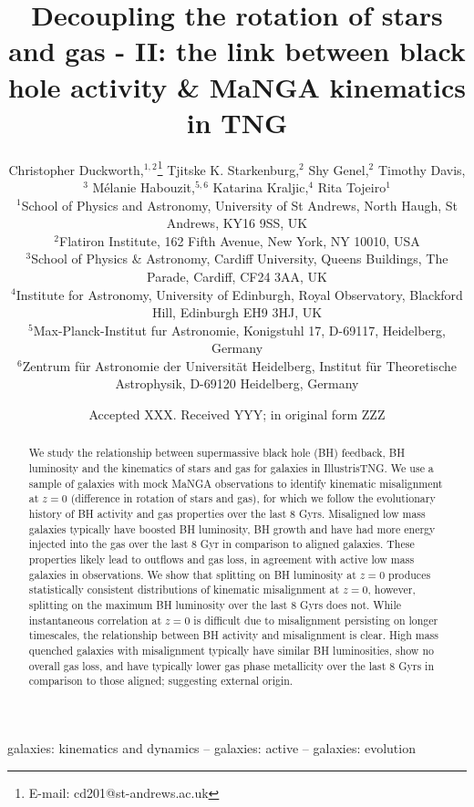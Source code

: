 \documentclass[fleqn,usenatbib]{mnras}
\title[Decoupling the rotation of stars and gas - II]{Decoupling the rotation of stars and gas - II: the link between black hole activity \& MaNGA kinematics in TNG}
\author[C. Duckworth et al.]
{Christopher Duckworth,$^{1,2}$\thanks{E-mail: cd201@st-andrews.ac.uk}
Tjitske K. Starkenburg,$^{2}$ 
Shy Genel,$^{2}$ 
Timothy Davis,$^{3}$ \newauthor
M\'elanie Habouzit,$^{5,6}$
Katarina Kraljic,$^{4}$
Rita Tojeiro$^{1}$ 
\\
$^{1}$School of Physics and Astronomy, University of St Andrews, North Haugh, St Andrews, KY16 9SS, UK\\
$^{2}$Flatiron Institute, 162 Fifth Avenue, New York, NY 10010, USA\\
$^{3}$School of Physics \& Astronomy, Cardiff University, Queens Buildings, The Parade, Cardiff, CF24 3AA, UK\\
$^{4}$Institute for Astronomy, University of Edinburgh, Royal Observatory, Blackford Hill, Edinburgh EH9 3HJ, UK\\
$^{5}$Max-Planck-Institut fur Astronomie, Konigstuhl 17, D-69117, Heidelberg, Germany\\
$^{6}$Zentrum f\"ur Astronomie der Universit\"at Heidelberg, Institut f\"ur Theoretische Astrophysik, D-69120 Heidelberg, Germany\\
}
\date{Accepted XXX. Received YYY; in original form ZZZ}
\begin{document}
\label{firstpage}
\pagerange{\pageref{firstpage}--\pageref{lastpage}}
\maketitle

\begin{abstract}
We study the relationship between supermassive black hole (BH) feedback, BH luminosity and the kinematics of stars and gas for galaxies in IllustrisTNG. We use a sample of galaxies with mock MaNGA observations to identify kinematic misalignment at $z=0$ (difference in rotation of stars and gas), for which we follow the evolutionary history of BH activity and gas properties over the last 8 Gyrs. Misaligned low mass galaxies typically have boosted BH luminosity, BH growth and have had more energy injected into the gas over the last 8 Gyr in comparison to aligned galaxies. These properties likely lead to outflows and gas loss, in agreement with active low mass galaxies in observations. We show that splitting on BH luminosity at $z=0$ produces statistically consistent distributions of kinematic misalignment at $z=0$, however, splitting on the maximum BH luminosity over the last 8 Gyrs does not. While instantaneous correlation at $z=0$ is difficult due to misalignment persisting on longer timescales, the relationship between BH activity and misalignment is clear. High mass quenched galaxies with misalignment typically have similar BH luminosities, show no overall gas loss, and have typically lower gas phase metallicity over the last 8 Gyrs in comparison to those aligned; suggesting external origin.
\end{abstract}

\begin{keywords}
galaxies: kinematics and dynamics -- galaxies: active -- galaxies: evolution
\end{keywords}


\end{document}
